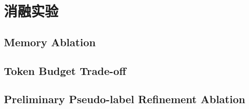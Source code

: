 \section{消融实验}
\label{sec:ablation}

\subsection{Memory Ablation}


\subsection{Token Budget Trade-off}


\subsection{Preliminary Pseudo-label Refinement Ablation}

